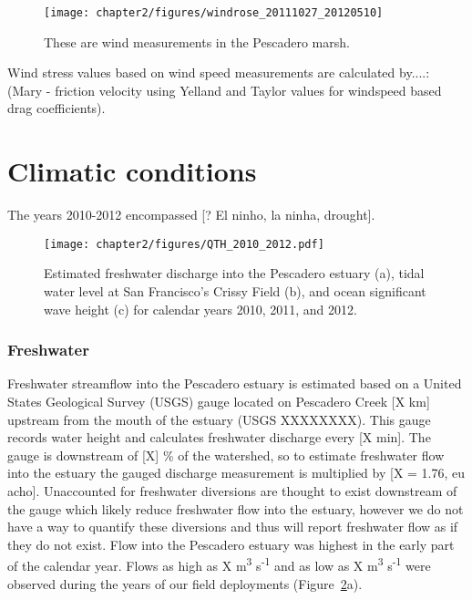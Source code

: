  \begin{figure}
 \texttt{[image: chapter2/figures/windrose\_20111027\_20120510]} \caption{These are wind 
measurements in
 the Pescadero marsh.} \label{fig:metstn_pdo_windrose} \end{figure}


Wind stress values based on wind speed measurements are calculated
by....:  (Mary - friction velocity using Yelland and Taylor values for
windspeed based drag coefficients).

% 
% 
\section{Climatic conditions} \label{conditions_label}

The years 2010-2012 encompassed [? El ninho, la ninha, drought].



\begin{figure}
\texttt{[image: chapter2/figures/QTH\_2010\_2012.pdf]} 
\caption{Estimated freshwater discharge into the Pescadero estuary (a), tidal water level at San Francisco's Crissy Field (b), and ocean significant wave height (c) for calendar years 2010, 2011, and 2012.}\label{fig:QTH_2010_2012}  
\end{figure}

\subsubsection{Freshwater}
Freshwater streamflow into the Pescadero estuary is
estimated based on a United States Geological Survey (USGS) gauge
located on Pescadero Creek [X km] upstream from the mouth of the estuary
(USGS XXXXXXXX). This gauge records water height and calculates
freshwater discharge every [X min]. The gauge is downstream of [X] \% of
the watershed, so to estimate freshwater flow into the estuary the
gauged discharge measurement is multiplied by [X = 1.76, eu acho].
Unaccounted for freshwater diversions are thought to exist downstream of
the gauge which likely reduce freshwater flow into the estuary, however
we do not have a way to quantify these diversions and thus will report
freshwater flow as if they do not exist. Flow into the Pescadero estuary was highest in the early part of the calendar year. Flows as high as X m\textsuperscript{3} s\textsuperscript{-1} and as low as X m\textsuperscript{3} s\textsuperscript{-1} were observed during the years of our field deployments (Figure~\ref{fig:QTH_2010_2012}a).

